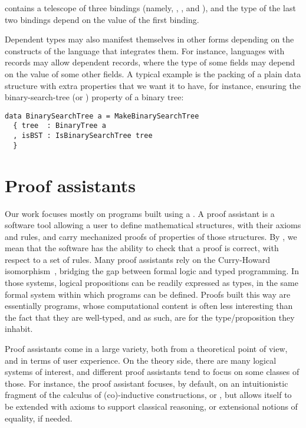 \noindent
{}

\noindent
contains a telescope of three bindings (namely, , ,
and ), and the type of the last two bindings depend on the value of
the first binding.

Dependent types may also manifest themselves in other forms depending on the
constructs of the language that integrates them.  For instance, languages with
records may allow dependent records, where the type of some fields may depend on
the value of some other fields.  A typical example is the packing of a plain
data structure with extra properties that we want it to have, for instance,
ensuring the binary-search-tree (or ) property of a binary tree:

\begin{verbatim}
data BinarySearchTree a = MakeBinarySearchTree
  { tree  : BinaryTree a
  , isBST : IsBinarySearchTree tree
  }
\end{verbatim}

\section{Proof assistants}

Our work focuses mostly on programs built using a .  A
proof assistant is a software tool allowing a user to define mathematical
structures, with their axioms and rules, and carry mechanized proofs of
properties of those structures.  By , we mean that the
software has the ability to check that a proof is correct, with respect to a set
of rules.  Many proof assistants rely on the Curry-Howard
isomorphism~\cite{howard1980formulae}, bridging the gap between formal logic and
typed programming.  In those systems, logical propositions can be readily
expressed as types, in the same formal system within which programs can be
defined.  Proofs built this way are essentially programs, whose computational
content is often less interesting than the fact that they are well-typed, and as
such, are  for the type/proposition they inhabit.

Proof assistants come in a large variety, both from a theoretical point of view,
and in terms of user experience.  On the theory side, there are many logical
systems of interest, and different proof assistants tend to focus on some
classes of those.  For instance, the \Coq{} proof assistant focuses, by default,
on an intuitionistic fragment of the calculus of (co)-inductive constructions,
or , but allows itself to be extended with axioms to support
classical reasoning, or extensional notions of equality, if needed.

